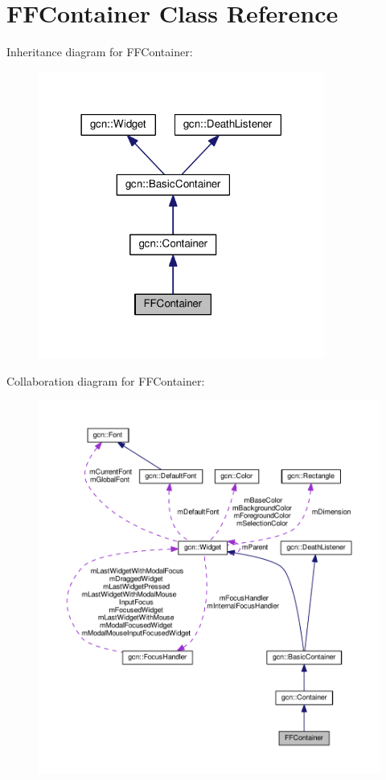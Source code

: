 \hypertarget{classFFContainer}{}\section{F\+F\+Container Class Reference}
\label{classFFContainer}


Inheritance diagram for F\+F\+Container\+:\nopagebreak
\begin{figure}[H]
\begin{center}
\leavevmode
\includegraphics[width=266pt]{classFFContainer__inherit__graph}
\end{center}
\end{figure}


Collaboration diagram for F\+F\+Container\+:\nopagebreak
\begin{figure}[H]
\begin{center}
\leavevmode
\includegraphics[width=350pt]{classFFContainer__coll__graph}
\end{center}
\end{figure}
